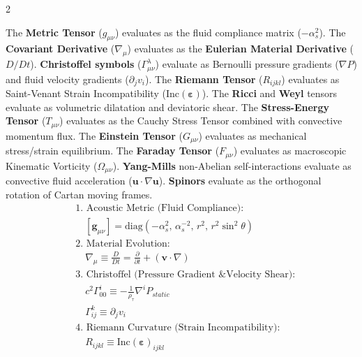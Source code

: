 \documentclass[11pt, a4paper]{article}
\newcounter{cheatnum}
\begin{document}
\begin{multicols}{2}
\begin{tcolorbox}[cheatbox, title={\refstepcounter{cheatnum}\label{box:rosetta_stone}\thecheatnum. Tensor Evolution \& Geometry\scriptsize\hfill\hyperref[sec:deriv_rosetta_stone]{[Proof $\downarrow$]}}]
The \textbf{Metric Tensor} ($g_{\mu\nu}$) evaluates as the fluid compliance matrix ($-\alpha_s^2$). The \textbf{Covariant Derivative} ($\nabla_\mu$) evaluates as the \textbf{Eulerian Material Derivative} ($D/Dt$). \textbf{Christoffel symbols} ($\Gamma^\lambda_{\mu\nu}$) evaluate as Bernoulli pressure gradients ($\nabla P$) and fluid velocity gradients ($\partial_j v_i$). The \textbf{Riemann Tensor} ($R_{ijkl}$) evaluates as Saint-Venant Strain Incompatibility ($\text{Inc}(\boldsymbol{\varepsilon})$). The \textbf{Ricci} and \textbf{Weyl} tensors evaluate as volumetric dilatation and deviatoric shear. The \textbf{Stress-Energy Tensor} ($T_{\mu\nu}$) evaluates as the Cauchy Stress Tensor combined with convective momentum flux. The \textbf{Einstein Tensor} ($G_{\mu\nu}$) evaluates as mechanical stress/strain equilibrium. The \textbf{Faraday Tensor} ($F_{\mu\nu}$) evaluates as macroscopic Kinematic Vorticity ($\Omega_{\mu\nu}$). \textbf{Yang-Mills} non-Abelian self-interactions evaluate as convective fluid acceleration ($\mathbf{u} \cdot \nabla \mathbf{u}$). \textbf{Spinors} evaluate as the orthogonal rotation of Cartan moving frames.
\begin{align}
    &\text{1. Acoustic Metric (Fluid Compliance):} \nonumber \\
    &\quad [\boldsymbol{g}_{\mu\nu}] = \text{diag}(-\alpha_s^2, \, \alpha_s^{-2}, \, r^2, \, r^2\sin^2\theta) 
    \label{eq:rosetta_metric_matrix} \\
    &\text{2. Material Evolution:} \nonumber \\
    &\quad \nabla_\mu \equiv \frac{D}{Dt} = \frac{\partial}{\partial t} + (\mathbf{v} \cdot \nabla) \label{eq:rosetta_covariant} \\
    &\text{3. Christoffel (Pressure Gradient \& Velocity Shear):} \nonumber \\
    &\quad c^2 \Gamma^i_{00} \equiv -\frac{1}{\rho_{\tau}} \nabla^i P_{static} \label{eq:rosetta_christoffel_pressure} \\
    &\quad \Gamma^k_{ij} \equiv \partial_j v_i \label{eq:rosetta_christoffel} \\
    &\text{4. Riemann Curvature (Strain Incompatibility):} \nonumber \\
    &\quad R_{ijkl} \equiv \text{Inc}(\boldsymbol{\varepsilon})_{ijkl} \label{eq:rosetta_riemann} \\

\end{align}
\end{tcolorbox}
\end{multicols}
\end{document}
